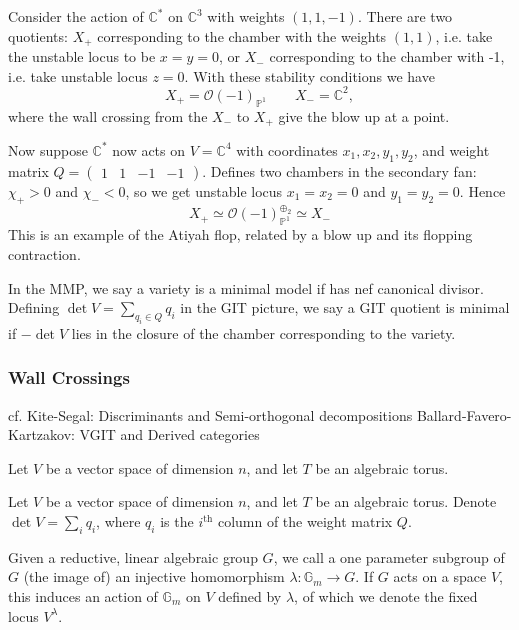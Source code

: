 \begin{example}{}{}
Consider the action of $\mathbb{C}^{*}$ on $\mathbb{C}^3$ with weights $(1,1,-1)$. 
There are two quotients: $X_+$ corresponding to the chamber with the weights $(1,1)$, i.e. take the unstable locus to be $x=y= 0$, or $X_-$ corresponding to the chamber with -1, i.e. take unstable locus $z = 0$. With these stability conditions we have $$
X_{+}= \mathcal{O}(-1)_{\mathbb{P}^{1}} \qquad X_{-}= \mathbb{C}^2, $$ where the wall crossing from the $X_-$ to $X_+$ give the blow up at a point. 

Now suppose $\mathbb{C}^*$ now acts on $V = \mathbb{C}^4$  with coordinates $x_{1}, x_{2}, y_{1},y_{2}$, and weight matrix $Q = \begin{pmatrix}1&1&-1&-1\end{pmatrix}$. 
Defines two chambers in the secondary fan: $\chi_{+}>0$ and $\chi_{-}<0$, so we get unstable locus $x_{1}= x_{2}= 0$ and $y_{1}= y_{2}=0$. Hence $$
X_{+}\simeq \mathcal{O}(-1)_{\mathbb{P}^{1}}^{\oplus_{2}}\simeq X_-
$$This is an example of the Atiyah flop, related by a blow up and its flopping contraction. 
\end{example}


In the MMP, we say a variety is a minimal model if has nef canonical divisor. Defining $\det V = \sum_{q_{i}\in Q}q_i$ in the GIT picture, we  say a GIT quotient is minimal if $-\det V$ lies in the closure of the chamber corresponding to the variety. 

\subsubsection{Wall Crossings}

cf. 
Kite-Segal: Discriminants and Semi-orthogonal decompositions
Ballard-Favero-Kartzakov: VGIT and Derived categories

Let $V$ be a vector space of dimension $n$, and let $T$ be an algebraic torus.

Let $V$ be a vector space of dimension $n$, and let $T$ be an algebraic torus. Denote $\det V = \sum_i q_i$, where $q_i$ is the $i^\mathrm{th}$ column of the weight matrix $Q$. 

\begin{definition}
    Given a reductive, linear algebraic group $G$, we call a one parameter subgroup of $G$ (the image of) an injective homomorphism $\lambda : \mathbb{G}_{m}\to G$. If $G$ acts on a space $V$, this induces an action of $\mathbb{G}_m$ on $V$ defined by $\lambda$, of which we denote the fixed locus $V^\lambda$. 
\end{definition}

